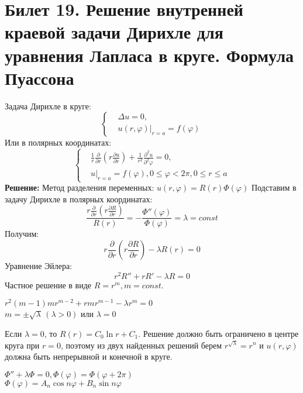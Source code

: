 \documentclass[11pt,a4paper]{article}
\begin{document}
    \section*{Билет 19. Решение внутренней краевой задачи Дирихле для уравнения Лапласа в круге. Формула Пуассона}
    Задача Дирихле в круге:
    \[ \left\{\begin{aligned}
    & \Delta u=0, \\ & u(r,\varphi)|_{r=a}=f(\varphi)
    \end{aligned}\right. \]
    Или в полярных координатах:
    \[ \left\{\begin{aligned}
    & \frac{1}{r} \frac{\partial}{\partial r}\left (r\frac{\partial u}{\partial r}\right)+\frac{1}{r^2}\frac{\partial^2 u}{\partial^2 \varphi}=0, \\ & u|_{r=a}=f(\varphi), 0\leq \varphi<2\pi, 0\leq r\leq a
    \end{aligned}\right. \]
    \textbf{Решение:}
    Метод разделения переменных: $u(r,\varphi)=R(r)\Phi(\varphi)$
    Подставим в задачу Дирихле в полярных координатах:
    \begin{equation}\label{eq:5}
    \frac{r\frac{\partial }{\partial r}\left(r\frac{\partial R}{\partial r} 
    \right)}{R(r)}=-\frac{\Phi''(\varphi)}{\Phi(\varphi)}=\lambda=const
    \end{equation}
    Получим:
    \begin{equation}\label{eq:1}
    r\frac{\partial }{\partial r}\left(r\frac{\partial R}{\partial r} 
    \right)-\lambda R(r)=0
    \end{equation}
    Уравнение Эйлера:
    \begin{equation}
    r^2R''+rR'-\lambda R=0
    \end{equation}
    Частное решение в виде $R=r^m, m=const$.
    \begin{center}
    $r^2(m-1)mr^{m-2}+rmr^{m-1}-\lambda r^m=0$\\
    $m=\pm \sqrt{\lambda}\,(\lambda>0)$ или $\lambda=0$
    \end{center}
    Если $\lambda=0$, то $R(r)=C_0\ln{r}+C_1$.
    Решение должно быть ограничено в центре круга при $r=0$, поэтому из двух найденных решений берем $r^{\sqrt{\lambda}}=r^n$ и $u(r,\varphi)$ должна быть непрерывной и конечной в круге.
    \begin{center}
    $\Phi''+\lambda\Phi=0, \Phi(\varphi)=\Phi(\varphi+2\pi)$ \\
    $\Phi(\varphi)=A_n\cos{n\varphi}+B_n\sin{n\varphi}$
    \end{center}
\end{document}
